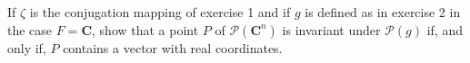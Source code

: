 If $\zeta$ is the conjugation mapping of exercise 1 and if $g$ is defined as in exercise 2 in the case $F = \mathbf{C}$, show that a point $P$ of $\mathcal{P}(\mathbf{C}^n)$ is invariant under $\mathcal{P}(g)$ if, and only if, $P$ contains a vector with real coordinates.

